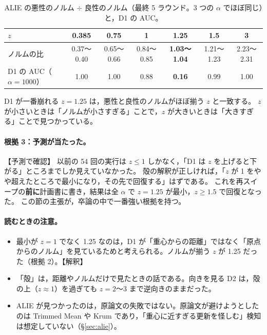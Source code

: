 \documentclass[a4j, dvipdfmx]{jsarticle}  %
\begin{document}
\begin{table}[H]
\centering
\caption{ALIE の悪性のノルム $\div$ 良性のノルム（最終 5 ラウンド。3 つの $\alpha$ でほぼ同じ）と，D1 の AUC。}
\label{tab:normratio}
\begin{tabular}{@{}lcccccc@{}}
\toprule
$z$ & 0.385 & 0.75 & 1 & 1.25 & 1.5 & 3 \\
\midrule
ノルムの比 & 0.37〜0.40 & 0.65〜0.66 & 0.84〜0.85 & \textbf{1.03〜1.04} & 1.21〜1.23 & 2.23〜2.31 \\
D1 の AUC（$\alpha = 1000$） & 1.00 & 1.00 & 0.88 & \textbf{0.16} & 0.99 & 1.00 \\
\bottomrule
\end{tabular}
\end{table}

D1 が一番崩れる $z = 1.25$ は，悪性と良性のノルムがほぼ揃う $z$ と一致する。
$z$ が小さいときは「ノルムが小さすぎる」ことで，$z$ が大きいときは「大きすぎる」ことで見つかっている。

\paragraph{根拠 3：予測が当たった。}【予測で確認】
以前の 54 回の実行は $z \le 1$ しかなく，「D1 は $z$ を上げると下がる」ところまでしか見えていなかった。
殻の解釈が正しければ，「$z$ が 1 をやや超えたところで最小になり，その先で回復する」はずである。
これを再スイープの\textbf{前に}計画書に書き，結果は全 $\alpha$ で $z = 1.25$ が最小，$z \ge 1.5$ で回復となった。
この節の主張が，卒論の中で一番強い根拠を持つ。

\paragraph{読むときの注意。}
\begin{itemize}
  \item 最小が $z = 1$ でなく 1.25 なのは，D1 が「重心からの距離」ではなく「原点からのノルム」を見ているためと考えられる。ノルムが揃う $z$ が 1.25 だった（根拠 2）。【解釈】
  \item 「殻」は，距離やノルムだけで見たときの話である。向きを見る D2 は，殻の上（$z \approx 1$）を過ぎても $z = 2$〜3 まで逆向きのままだった。
  \item ALIE が見つかったのは，原論文の失敗ではない。原論文が避けようとしたのは Trimmed Mean や Krum であり，「重心に近すぎる更新を怪しむ」検知は想定していない（\S\ref{sec:alie}）。
\end{itemize}

\end{document}
